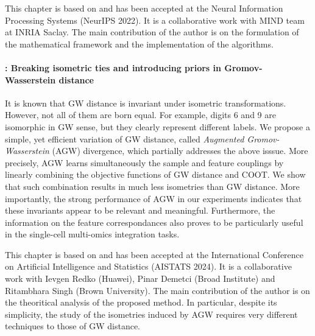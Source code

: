 \begin{enumerate}
    This chapter is based on \citep{Thual22} and has been accepted at the
    Neural Information Processing Systems (NeurIPS 2022).
    It is a collaborative work with MIND team at INRIA Saclay.
    The main contribution of the author is on the formulation of the mathematical framework
    and the implementation of the algorithms.
\end{enumerate}

\paragraph{: Breaking isometric ties and introducing priors in
Gromov-Wasserstein distance}

It is known that GW distance is invariant under isometric transformations. However,
not all of them are born equal. For example, digits 6 and 9 are isomorphic in GW sense,
but they clearly represent different labels. We propose a simple,
yet efficient variation of GW distance, called \textit{Augmented Gromov-Wasserstein} (AGW) divergence,
which partially addresses the above isssue.
More precisely, AGW learns simultaneously the sample and feature couplings by
linearly combining the objective functions of GW distance and COOT.
We show that such combination results in much less isometries than GW distance.
More importantly, the strong performance of AGW in our experiments indicates
that these invariants appear to be relevant and meaningful.
Furthermore, the information on the feature correspondances also proves to be particularly useful
in the single-cell multi-omics integration tasks.

This chapter is based on \citep{Demetci23} and has been accepted at the
International Conference on Artificial Intelligence and Statistics (AISTATS 2024).
It is a collaborative work with Ievgen Redko (Huawei), Pinar Demetci (Broad Institute)
and Ritambhara Singh (Brown University). The main contribution of the author is on the
theoritical analysis of the proposed method. In particular, despite its simplicity,
the study of the isometries induced by AGW requires very different techniques
to those of GW distance.